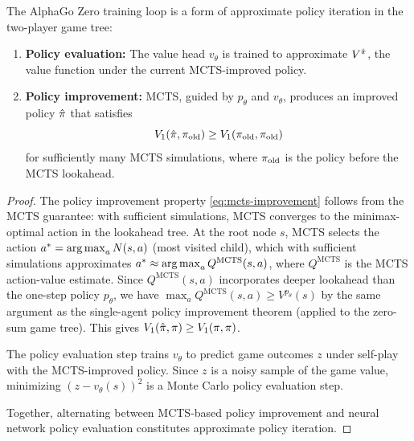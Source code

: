 \documentclass[11pt,a4paper]{article}
\begin{document}
\begin{proposition}
\label{prop:alphago-api}
The AlphaGo Zero training loop is a form of approximate policy
iteration in the two-player game tree:
\begin{enumerate}
  \item \textbf{Policy evaluation:} The value head $v_\theta$ is
    trained to approximate $V^{\hat{\pi}}$, the value function under
    the current MCTS-improved policy.
  \item \textbf{Policy improvement:} MCTS, guided by $p_\theta$ and
    $v_\theta$, produces an improved policy $\hat{\pi}$ that
    satisfies
    \begin{equation}
    \label{eq:mcts-improvement}
      V_1(\hat{\pi}, \pi_{\mathrm{old}})
      \ge V_1(\pi_{\mathrm{old}}, \pi_{\mathrm{old}})
    \end{equation}
    for sufficiently many MCTS simulations, where $\pi_{\mathrm{old}}$
    is the policy before the MCTS lookahead.
\end{enumerate}
\end{proposition}

\begin{proof}
The policy improvement property \eqref{eq:mcts-improvement} follows from
the MCTS guarantee: with sufficient simulations, MCTS converges to the
minimax-optimal action in the lookahead tree.  At the root node $s$,
MCTS selects the action $a^* = \operatorname{arg\,max}_a N(s,a)$ (most visited child),
which with sufficient simulations approximates
$a^* \approx \operatorname{arg\,max}_a Q^{\mathrm{MCTS}}(s, a)$, where
$Q^{\mathrm{MCTS}}$ is the MCTS action-value estimate.  Since
$Q^{\mathrm{MCTS}}(s, a)$ incorporates deeper lookahead than the
one-step policy $p_\theta$, we have
$\max_a Q^{\mathrm{MCTS}}(s, a) \ge V^{p_\theta}(s)$ by the same
argument as the single-agent policy improvement theorem (applied to the
zero-sum game tree).  This gives
$V_1(\hat{\pi}, \pi) \ge V_1(\pi, \pi)$.

The policy evaluation step trains $v_\theta$ to predict game outcomes
$z$ under self-play with the MCTS-improved policy.  Since $z$ is a
noisy sample of the game value, minimizing $(z - v_\theta(s))^2$ is
a Monte Carlo policy evaluation step.

Together, alternating between MCTS-based policy improvement and neural
network policy evaluation constitutes approximate policy iteration.
\end{proof}
\end{document}
